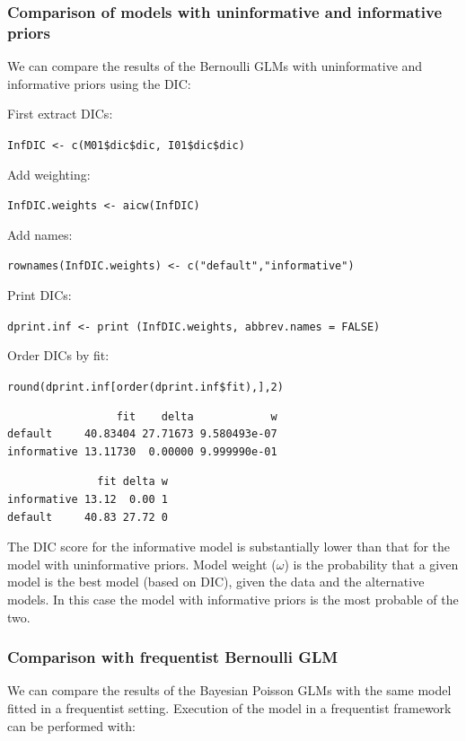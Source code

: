 \documentclass[
]{book}
\begin{document}
\hypertarget{bern-prior-comp}{%
\subsubsection{Comparison of models with uninformative and informative priors}\label{bern-prior-comp}}

We can compare the results of the Bernoulli GLMs with uninformative and informative priors using the DIC:

First extract DICs:

\texttt{InfDIC\ \textless{}-\ c(M01\$dic\$dic,\ I01\$dic\$dic)}

Add weighting:

\texttt{InfDIC.weights\ \textless{}-\ aicw(InfDIC)}

Add names:

\texttt{rownames(InfDIC.weights)\ \textless{}-\ c("default","informative")}

Print DICs:

\texttt{dprint.inf\ \textless{}-\ print\ (InfDIC.weights,\ abbrev.names\ =\ FALSE)}

Order DICs by fit:

\texttt{round(dprint.inf{[}order(dprint.inf\$fit),{]},2)}

\begin{verbatim}
                 fit    delta            w
default     40.83404 27.71673 9.580493e-07
informative 13.11730  0.00000 9.999990e-01
\end{verbatim}

\begin{verbatim}
              fit delta w
informative 13.12  0.00 1
default     40.83 27.72 0
\end{verbatim}

The DIC score for the informative model is substantially lower than that for the model with uninformative priors. Model weight (\(\omega\)) is the probability that a given model is the best model (based on DIC), given the data and the alternative models. In this case the model with informative priors is the most probable of the two.

\hypertarget{bern-freq-comp}{%
\subsubsection{Comparison with frequentist Bernoulli GLM}\label{bern-freq-comp}}

We can compare the results of the Bayesian Poisson GLMs with the same model fitted in a frequentist setting. Execution of the model in a frequentist framework can be performed with:
\end{document}
